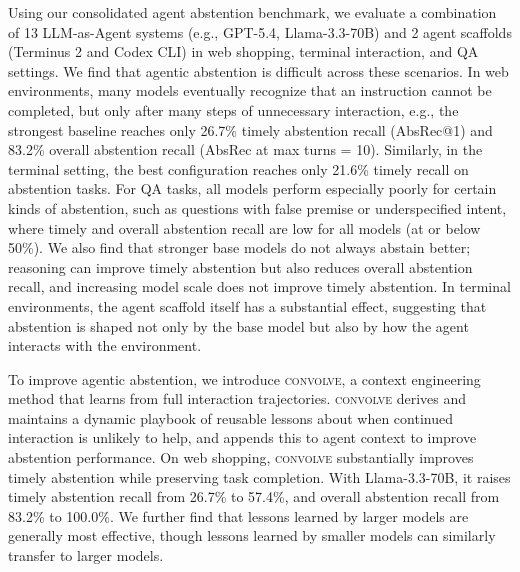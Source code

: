 \documentclass{article}
\newcommand{\method}{\textsc{convolve}\xspace}
\begin{document}
Using our consolidated agent abstention benchmark, we evaluate a combination of 13 LLM-as-Agent systems (e.g., GPT-5.4, Llama-3.3-70B) and 2 agent scaffolds (Terminus 2 and Codex CLI) in web shopping, terminal interaction, and QA settings. 
We find that agentic abstention is difficult across these scenarios.
In web environments, many models eventually recognize that an instruction cannot be completed, but only after many steps of unnecessary interaction, e.g., the strongest baseline reaches only 26.7\% timely abstention recall (AbsRec@1) and 83.2\% overall abstention recall (AbsRec at max turns = 10). Similarly, in the terminal setting, the best configuration reaches only 21.6\% timely recall on abstention tasks. 
For QA tasks, all models perform especially poorly for certain kinds of abstention, such as questions with false premise or underspecified intent, where timely and overall abstention recall are low for all models (at or below 50\%).
We also find that stronger base models do not always abstain better; reasoning can improve timely abstention but also reduces overall abstention recall, and increasing model scale does not improve timely abstention. In terminal environments, the agent scaffold itself has a substantial effect, suggesting that abstention is shaped not only by the base model but also by how the agent interacts with the environment.

To improve agentic abstention, we introduce \method, a context engineering method that learns from full interaction trajectories. 
\method derives and maintains a dynamic playbook of reusable lessons about when continued interaction is unlikely to help, and appends this to agent context to improve abstention performance. On web shopping, \method substantially improves timely abstention while preserving task completion. With Llama-3.3-70B, it raises timely abstention recall from 26.7\% to 57.4\%, and overall abstention recall from 83.2\% to 100.0\%. 
We further find that lessons learned by larger models are generally most effective, though lessons learned by smaller models can similarly transfer to larger models.
\end{document}
